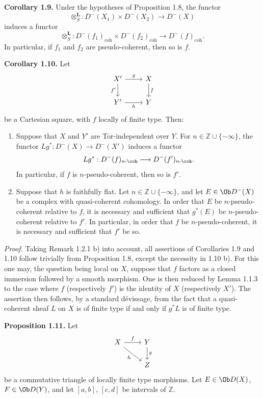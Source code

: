 \documentclass[11pt]{article}
\begin{document}
\textbf{Corollary 1.9.} Under the hypotheses of Proposition 1.8, the functor
\[
  \otimes_S^{\mathbf L}:D^{-}(X_1)\times D^{-}(X_2)\longrightarrow D^{-}(X)
\]
induces a functor
\[
  \otimes_S^{\mathbf L}:D^{-}(f_1)_{\mathrm{coh}}\times D^{-}(f_2)_{\mathrm{coh}}
  \longrightarrow D^{-}(f)_{\mathrm{coh}} .
\]
In particular, if \(f_1\) and \(f_2\) are pseudo-coherent, then so is \(f\).

\textbf{Corollary 1.10.} Let
\[
\begin{tikzcd}
X' \arrow[r,"g"] \arrow[d,"f'"'] & X \arrow[d,"f"]\\
Y' \arrow[r,"h"'] & Y
\end{tikzcd}
\]
be a Cartesian square, with \(f\) locally of finite type. Then:
\begin{enumerate}[label=\alph*)]
\item Suppose that \(X\) and \(Y'\) are Tor-independent over \(Y\). For \(n\in\mathbb Z\cup\{-\infty\}\), the functor \(Lg^*:D^{-}(X)\to D^{-}(X')\) induces a functor
\[
  Lg^*:D^{-}(f)_{n\text{-}\coh}\longrightarrow D^{-}(f')_{n\text{-}\coh}.
\]
In particular, if \(f\) is \(n\)-pseudo-coherent, then so is \(f'\).

\item Suppose that \(h\) is faithfully flat. Let \(n\in\mathbb Z\cup\{-\infty\}\), and let \(E\in\Ob D^{-}(X)\) be a complex with quasi-coherent cohomology. In order that \(E\) be \(n\)-pseudo-coherent relative to \(f\), it is necessary and sufficient that \(g^*(E)\) be \(n\)-pseudo-coherent relative to \(f'\). In particular, in order that \(f\) be \(n\)-pseudo-coherent, it is necessary and sufficient that \(f'\) be so.
\end{enumerate}

\emph{Proof.} Taking Remark 1.2.1 b) into account, all assertions of Corollaries 1.9 and 1.10 follow trivially from Proposition 1.8, except the necessity in 1.10 b). For this one may, the question being local on \(X\), suppose that \(f\) factors as a closed immersion followed by a smooth morphism. One is then reduced by Lemma 1.1.3 to the case where \(f\) (respectively \(f'\)) is the identity of \(X\) (respectively \(X'\)). The assertion then follows, by a standard dévissage, from the fact that a quasi-coherent sheaf \(L\) on \(X\) is of finite type if and only if \(g^*L\) is of finite type.

\textbf{Proposition 1.11.} Let
\[
\begin{tikzcd}
X \arrow[r,"f"] \arrow[dr,"h"'] & Y \arrow[d,"g"]\\
& Z
\end{tikzcd}
\]
be a commutative triangle of locally finite type morphisms. Let \(E\in\Ob D(X)\), \(F\in\Ob D(Y)\), and let \([a,b]\), \([c,d]\) be intervals of \(\mathbb Z\).
\end{document}
